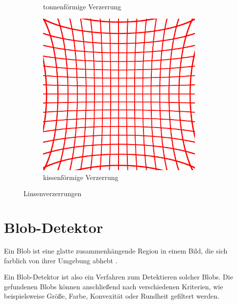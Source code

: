 \begin{figure}[!htb]
\begin{subfigure}{.33\textwidth}
		\caption{tonnenförmige Verzerrung}
		\label{fig:barrel}
	\end{subfigure}%
	\begin{subfigure}{.33\textwidth}
		\centering
		\includegraphics[width=0.9\textwidth]{images/cushionDistortion.png}
		\caption{kissenförmige Verzerrung}
		\label{fig:cushion}
	\end{subfigure}
	\caption{Linsenverzerrungen}
	\label{fig:distortion}
\end{figure}



\section{Blob-Detektor}
\label{s:blob}
\begin{definition}[Blob]\label{def:blob}
	Ein Blob ist eine glatte zusammenhängende Region in einem Bild, die sich farblich von ihrer Umgebung abhebt \cite{Lindeberg1993}.
\end{definition}

Ein Blob-Detektor ist also ein Verfahren zum Detektieren solcher Blobs. Die gefundenen Blobs können anschließend nach verschiedenen Kriterien, wie beispielsweise Größe, Farbe, Konvexität oder Rundheit gefiltert werden.


